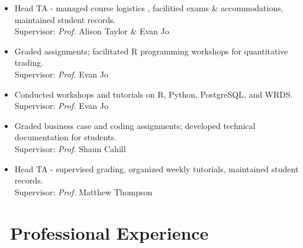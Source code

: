 \documentclass{resume}
\begin{document}
\begin{itemize}
  \item {}
  {Head TA - managed course logistics , facilitied exams \& accommodations, maintained student records.}\\
  {Supervisor: \emph{Prof.} Alison Taylor \& Evan Jo}\\
  \vspace{-0.5em}
  
  \item {}
  {Graded assignments; facilitated R programming workshops for quantitative trading. }\\
  {Supervisor: \emph{Prof.} Evan Jo}\\
  \vspace{-0.5em}
  
  \item {}
  {Conducted workshops and tutorials on R, Python, PostgreSQL, and WRDS.}\\
  {Supervisor: \emph{Prof.} Evan Jo}\\
  \vspace{-0.5em}
  
  \item {}
  {Graded business case and coding assignments; developed technical documentation for students.}\\
  {Supervisor: \emph{Prof.} Shaun Cahill}\\
  \vspace{-0.5em}
    
  \item {}
  {Head TA - supervised grading, organized weekly tutorials, maintained student records.}\\
  {Supervisor: \emph{Prof.} Matthew Thompson}\\
  \vspace{-0.5em}
  
\end{itemize}


\section{\faBriefcase\ Professional Experience}
\end{document}
